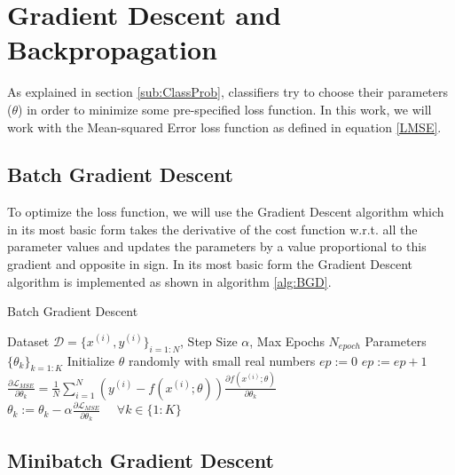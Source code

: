 \section{Gradient Descent and Backpropagation}
\label{GD}

As explained in section \ref{sub:ClassProb}, classifiers try to choose their parameters ($\theta$) in order to minimize some pre-specified loss function.
In this work, we will work with the Mean-squared Error loss function as defined in equation \ref{LMSE}.

\subsection{Batch Gradient Descent}
\label{sub:BGD}

To optimize the loss function, we will use the Gradient Descent algorithm which in its most basic form takes the derivative of the cost function w.r.t. all the parameter values and updates the parameters by a value proportional to this gradient and opposite in sign.
In its most basic form the Gradient Descent algorithm is implemented as shown in algorithm \ref{alg:BGD}.
\begin{algorithm}[tb]
   \caption{Batch Gradient Descent}
   \label{alg:BGD}
\begin{algorithmic}
    Dataset $\mathcal{D} = \{x^{(i)},y^{(i)}\}_{i=1:N}$, Step Size $\alpha$, Max Epochs $N_{epoch}$
    Parameters $\{\theta_k\}_{k=1:K}$
   \STATE
   \STATE Initialize $\theta$ randomly with small real numbers
   \STATE $ep := 0$
   \REPEAT
   \STATE $ep := ep + 1$
   \STATE $\frac{\partial \mathcal{L}_{MSE}}{\partial \theta_k} = \frac{1}{N} \sum_{i=1}^N ( y^{(i)} - f(x^{(i)}; \theta)) \frac{\partial f(x^{(i)}; \theta)}{\partial \theta_k}$
   \ENDFOR
   \STATE $\theta_k := \theta_k - \alpha \frac{\partial \mathcal{L}_{MSE}}{\partial \theta_k} \hspace{16pt} \forall k \in \{1:K\}$
\end{algorithmic}
\end{algorithm}

\subsection{Minibatch Gradient Descent}
\label{sub:MGD}

